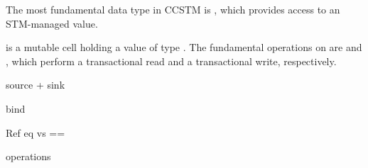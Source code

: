 The most fundamental data type in CCSTM is , which provides
access to an STM-managed value.

is a
mutable cell holding a value of type .  The fundamental
operations on  are  and , which perform
a transactional read and a transactional write, respectively.

source + sink

bind

Ref eq vs ==

operations
